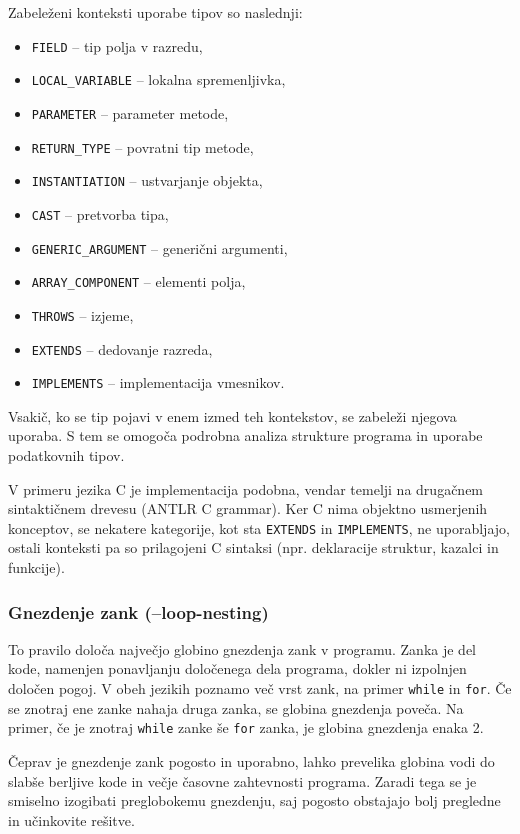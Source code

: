 \documentclass[a4paper,12pt,openright]{book}
\begin{document}
Zabeleženi konteksti uporabe tipov so naslednji:
\begin{itemize}
    \item \texttt{FIELD} – tip polja v razredu,
    \item \texttt{LOCAL\_VARIABLE} – lokalna spremenljivka,
    \item \texttt{PARAMETER} – parameter metode,
    \item \texttt{RETURN\_TYPE} – povratni tip metode,
    \item \texttt{INSTANTIATION} – ustvarjanje objekta,
    \item \texttt{CAST} – pretvorba tipa,
    \item \texttt{GENERIC\_ARGUMENT} – generični argumenti,
    \item \texttt{ARRAY\_COMPONENT} – elementi polja,
    \item \texttt{THROWS} – izjeme,
    \item \texttt{EXTENDS} – dedovanje razreda,
    \item \texttt{IMPLEMENTS} – implementacija vmesnikov.
\end{itemize}

Vsakič, ko se tip pojavi v enem izmed teh kontekstov, se zabeleži njegova uporaba. S tem se omogoča podrobna analiza strukture programa in uporabe podatkovnih tipov.

V primeru jezika C je implementacija podobna, vendar temelji na drugačnem sintaktičnem drevesu (ANTLR C grammar). Ker C nima objektno usmerjenih konceptov, se nekatere kategorije, kot sta \texttt{EXTENDS} in \texttt{IMPLEMENTS}, ne uporabljajo, ostali konteksti pa so prilagojeni C sintaksi (npr. deklaracije struktur, kazalci in funkcije).

\subsubsection{Gnezdenje zank (--loop-nesting)}

To pravilo določa največjo globino gnezdenja zank v programu. Zanka je del kode, namenjen ponavljanju določenega dela programa, dokler ni izpolnjen določen pogoj. V obeh jezikih poznamo več vrst zank, na primer \texttt{while} in \texttt{for}. Če se znotraj ene zanke nahaja druga zanka, se globina gnezdenja poveča. Na primer, če je znotraj \texttt{while} zanke še \texttt{for} zanka, je globina gnezdenja enaka 2.

Čeprav je gnezdenje zank pogosto in uporabno, lahko prevelika globina vodi do slabše berljive kode in večje časovne zahtevnosti programa. Zaradi tega se je smiselno izogibati preglobokemu gnezdenju, saj pogosto obstajajo bolj pregledne in učinkovite rešitve.
\end{document}
